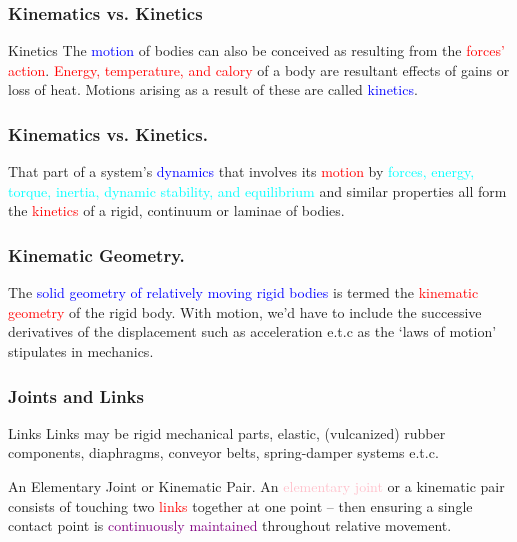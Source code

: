 \begin{frame}
	\frametitle{Kinematics vs. Kinetics}
	\begin{block}{Kinetics}
		The \textcolor{blue}{motion} of bodies can also be conceived as resulting from the  \textcolor{red}{forces' action}.  \textcolor{red}{Energy, temperature, and calory} of a body are resultant effects of gains or loss of heat. Motions arising as a result of these are called \textcolor{blue}{kinetics}.
	\end{block}
\end{frame}


\begin{frame}
	\frametitle{Kinematics vs. Kinetics.}
	\begin{definition}
		That part of a system's \textcolor{blue}{dynamics} that involves its \textcolor{red}{motion} by \textcolor{cyan}{forces, energy, torque, inertia, dynamic stability, and equilibrium} and similar properties all form the \textcolor{red}{kinetics} of a \textcolor{light-blue}{{rigid}}, \textcolor{light-blue}{{continuum}} or \textcolor{light-blue}{{laminae}} of bodies.
	\end{definition}
\end{frame}

\begin{frame}
	\frametitle{Kinematic Geometry.}
	\begin{definition}
		The \textcolor{blue}{solid geometry of relatively moving rigid bodies} is termed the \textcolor{red}{kinematic geometry} of the rigid body. With motion, we'd have to include the successive derivatives of the displacement such as acceleration e.t.c as the `laws of motion' stipulates in mechanics.
	\end{definition}
\end{frame}



\begin{frame}
	\frametitle{Joints and Links}
	\begin{block}{Links}
		Links may be rigid mechanical parts, elastic, (vulcanized) rubber components, diaphragms, conveyor belts, spring-damper systems e.t.c.
	\end{block}
	\begin{block}{An Elementary Joint or Kinematic Pair.}
		An \textcolor{pink}{elementary joint} or a \textcolor{light-blue}{kinematic pair} consists of touching two \textcolor{red}{links} \textcolor{light-blue}{together at one point} -- then ensuring a single contact point is \textcolor{purple}{continuously maintained} throughout \textcolor{light-blue}{relative movement}. 
	\end{block}
\end{frame}



